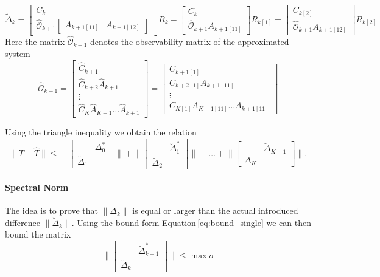 \documentclass[doctype=mastersthesis,BCOR=15mm,biblatex]{ldvbook}%
\newcommand{\Ob}{\mathcal{O}} %
\begin{document}
\begin{equation*}
\tilde{\Delta}_k=
	\begin{bmatrix}
	C_k\\
	\hat{\Ob}_{k+1}\begin{bmatrix}
	A_{k+1[11]}&A_{k+1[12]}
	\end{bmatrix}
	\end{bmatrix}
	R_k
	-
	\begin{bmatrix}
C_k\\
\hat{\Ob}_{k+1}
A_{k+1[11]}
\end{bmatrix}
R_{k[1]}
= 
\begin{bmatrix}
C_{k[2]}\\
\hat{\Ob}_{k+1}A_{k+1[12]}
\end{bmatrix}
R_{k[2]}
\end{equation*}
Here the matrix $\hat{\Ob}_{k+1}$ denotes the observability matrix of the approximated system 
\begin{equation}
\hat{\Ob}_{k+1}=
\begin{bmatrix}
\hat{C}_{k+1}\\
\hat{C}_{k+2}\hat{A}_{k+1}\\
\vdots \\
\hat{C}_{K} \hat{A}_{K-1} \dots \hat{A}_{k+1}
\end{bmatrix}
=
\begin{bmatrix}
C_{k+1[1]}\\
C_{k+2[1]}A_{k+1[11]}\\
\vdots\\
C_{K[1]}A_{K-1[11]}\dots A_{k+1[11]}
\end{bmatrix}
\end{equation}

Using the triangle inequality we obtain the relation
\begin{equation}
\|T-\hat{T}\| \leq
\Bigg\|
\begin{bmatrix}
&\Delta_0^*\\
\breve{\Delta}_1
\end{bmatrix}
\Bigg\|+\Bigg\|
\begin{bmatrix}
&\breve{\Delta}_1^*\\
\breve{\Delta}_2
\end{bmatrix}
\Bigg\|+\dots+\Bigg\|
\begin{bmatrix}
&\breve{\Delta}_{K-1}\\
\Delta_K
\end{bmatrix}
\Bigg\|.
\end{equation}

\paragraph{Spectral Norm}
The idea is to prove that $\|\Delta_k\|$ is equal or larger than the actual introduced difference $\|\breve{\Delta}_k\|$.
Using the bound form Equation\,\ref{eq:bound_single} we can then bound the matrix
\begin{equation}
\Bigg\|
\begin{bmatrix}
& \breve{\Delta}_{k-1}^*\\
\breve{\Delta}_k
\end{bmatrix}
\Bigg\| \leq \max{\sigma}
\end{equation}
\end{document}
